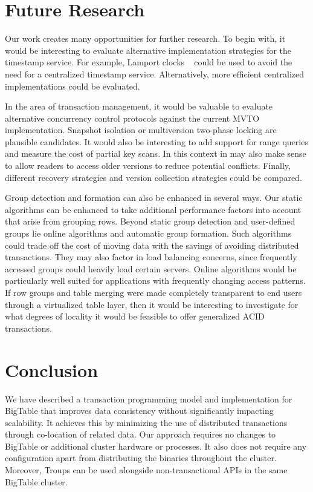 \documentclass[10pt,final,journal]{IEEEtran}
\begin{document}
\section{Future Research}
Our work creates many opportunities for further research. To begin with, it would be interesting to evaluate alternative implementation strategies for the timestamp service. For example, Lamport clocks ~\cite{Lamport:1978:TCO:359545.359563} could be used to avoid the need for a centralized timestamp service. Alternatively, more efficient centralized implementations could be evaluated.

In the area of transaction management, it would be valuable to evaluate alternative concurrency control protocols against the current MVTO implementation. Snapshot isolation or multiversion two-phase locking are plausible candidates. It would also be interesting to add support for range queries and measure the cost of partial key scans. In this context in may also make sense to allow readers to access older versions to reduce potential conflicts. Finally, different recovery strategies and version collection strategies could be compared.

Group detection and formation can also be enhanced in several ways. Our static algorithms can be enhanced to take additional performance factors into account that arise from grouping rows. Beyond static group detection and user-defined groups lie online algorithms and automatic group formation. Such algorithms could trade off the cost of moving data with the savings of avoiding distributed transactions. They may also factor in load balancing concerns, since frequently accessed groups could heavily load certain servers. Online algorithms would be particularly well suited for applications with frequently changing access patterns. If row groups and table merging were made completely transparent to end users through a virtualized table layer, then it would be interesting to investigate for what degrees of locality it would be feasible to offer generalized ACID transactions.

\section{Conclusion}
We have described a transaction programming model and implementation for BigTable that improves data consistency without significantly impacting scalability. It achieves this by minimizing the use of distributed transactions through co-location of related data. Our approach requires no changes to BigTable or additional cluster hardware or processes. It also does not require any configuration apart from distributing the binaries throughout the cluster. Moreover, Troups can be used alongside non-transactional APIs in the same BigTable cluster.
\end{document}
